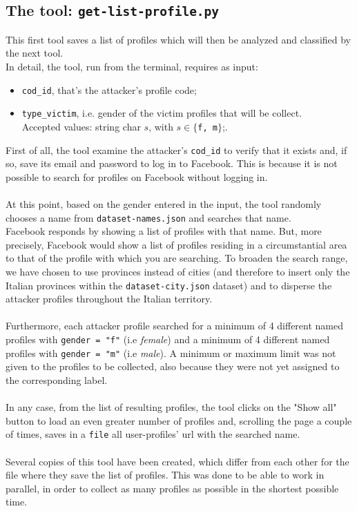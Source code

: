 \subsection{The tool: \texttt{get-list-profile.py}}
This first tool saves a list of profiles which will then be analyzed and classified by the next tool.
\\In detail, the tool, run from the terminal, requires as input:
\begin{itemize}
	\item \texttt{cod\_id}, that's the attacker's profile code;
	\item \texttt{type\_victim}, i.e. gender of the victim profiles that will be collect.\\Accepted values: string char $s$, with $s \in \{$\texttt{f, m}$\}$;.
\end{itemize}
First of all, the tool examine the attacker's \texttt{cod\_id} to verify that it exists and, if so, save its email and password to log in to Facebook. This is because it is not possible to search for profiles on Facebook without logging in.
\\\\At this point, based on the gender entered in the input, the tool randomly chooses a name from \texttt{dataset-names.json} and searches that name.
\\Facebook responds by showing a list of profiles with that name. But, more precisely, Facebook would show a list of profiles residing in a circumstantial area to that of the profile with which you are searching. To broaden the search range, we have chosen to use provinces instead of cities (and therefore to insert only the Italian provinces within the \texttt{dataset-city.json} dataset) and to disperse the attacker profiles throughout the Italian territory. 
\\\\Furthermore, each attacker profile searched for a minimum of 4 different named profiles with \texttt{gender = "f"} (i.e \textit{female}) and a minimum of 4 different named profiles with \texttt{gender = "m"} (i.e \textit{male}). A minimum or maximum limit was not given to the profiles to be collected, also because they were not yet assigned to the corresponding label.
\\\\In any case, from the list of resulting profiles, the tool clicks on the "Show all" button to load an even greater number of profiles and, scrolling the page a couple of times, saves in a \texttt{file} all user-profiles' url with the searched name.
\\\\Several copies of this tool have been created, which differ from each other for the file where they save the list of profiles. This was done to be able to work in parallel, in order to collect as many profiles as possible in the shortest possible time.

